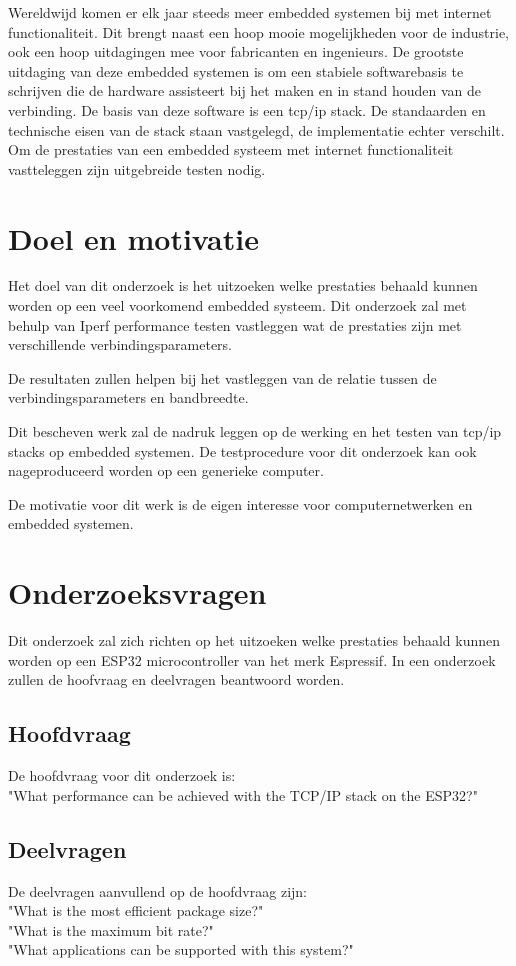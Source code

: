 \documentclass[../DCM2_Verslag.tex]{subfiles}
\begin{document}
Wereldwijd komen er elk jaar steeds meer embedded systemen bij met internet functionaliteit.
Dit brengt naast een hoop mooie mogelijkheden voor de industrie, ook een hoop uitdagingen mee voor fabricanten en ingenieurs. De grootste uitdaging van deze embedded systemen is om een stabiele softwarebasis te schrijven die de hardware assisteert bij het maken en in stand houden van de verbinding. De basis van deze software is een tcp/ip stack. De standaarden en technische eisen van de stack staan vastgelegd, de implementatie echter verschilt. Om de prestaties van een embedded systeem met internet functionaliteit vastteleggen zijn uitgebreide testen nodig. 

\section{Doel en motivatie}
Het doel van dit onderzoek is het uitzoeken welke prestaties behaald kunnen worden op een veel voorkomend embedded systeem. Dit onderzoek zal met behulp van Iperf performance testen vastleggen wat de prestaties zijn met verschillende verbindingsparameters. 

De resultaten zullen helpen bij het vastleggen van de relatie tussen de verbindingsparameters en bandbreedte. 

Dit bescheven werk zal de nadruk leggen op de werking en het testen van tcp/ip stacks op embedded systemen. De testprocedure voor dit onderzoek kan ook nageproduceerd worden op een generieke computer.

De motivatie voor dit werk is de eigen interesse voor computernetwerken en embedded systemen.
\clearpage
\section{Onderzoeksvragen}
Dit onderzoek zal zich richten op het uitzoeken welke prestaties behaald kunnen worden op een ESP32 microcontroller van het merk Espressif. In een onderzoek zullen de hoofvraag en deelvragen beantwoord worden. 

\subsection{Hoofdvraag}
De hoofdvraag voor dit onderzoek is:\\
"What performance can be achieved with the TCP/IP stack on the ESP32?"

\subsection{Deelvragen}
De deelvragen aanvullend op de hoofdvraag zijn:\\
"What is the most efficient package size?"\\
"What is the maximum bit rate?"\\
"What applications can be supported with this system?"\\
\end{document}
